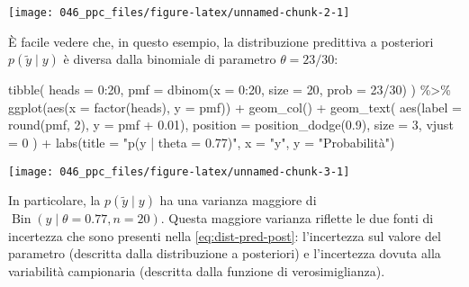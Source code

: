 \documentclass[
]{memoir}
\newenvironment{Shaded}{\begin{snugshade}}{\end{snugshade}}
\newcommand{\AttributeTok}[1]{\textcolor[rgb]{0.77,0.63,0.00}{#1}}
\newcommand{\DecValTok}[1]{\textcolor[rgb]{0.00,0.00,0.81}{#1}}
\newcommand{\FloatTok}[1]{\textcolor[rgb]{0.00,0.00,0.81}{#1}}
\newcommand{\FunctionTok}[1]{\textcolor[rgb]{0.00,0.00,0.00}{#1}}
\newcommand{\NormalTok}[1]{#1}
\newcommand{\SpecialCharTok}[1]{\textcolor[rgb]{0.00,0.00,0.00}{#1}}
\newcommand{\StringTok}[1]{\textcolor[rgb]{0.31,0.60,0.02}{#1}}
\DeclareMathOperator{\Bin}{Bin} %
\theoremstyle{definition}
\theoremstyle{definition}
\theoremstyle{definition}
\theoremstyle{definition}
\theoremstyle{remark}
\begin{document}
\begin{center}\texttt{[image: 046\_ppc\_files/figure-latex/unnamed-chunk-2-1]} \end{center}

È facile vedere che, in questo esempio, la distribuzione predittiva a posteriori \(p(\tilde{y} \mid y)\) è diversa dalla binomiale di parametro \(\theta = 23/30\):

\begin{Shaded}
\begin{Highlighting}[]
\FunctionTok{tibble}\NormalTok{(}
  \AttributeTok{heads =} \DecValTok{0}\SpecialCharTok{:}\DecValTok{20}\NormalTok{, }
  \AttributeTok{pmf =} \FunctionTok{dbinom}\NormalTok{(}\AttributeTok{x =} \DecValTok{0}\SpecialCharTok{:}\DecValTok{20}\NormalTok{, }\AttributeTok{size =} \DecValTok{20}\NormalTok{, }\AttributeTok{prob =} \DecValTok{23}\SpecialCharTok{/}\DecValTok{30}\NormalTok{)}
\NormalTok{) }\SpecialCharTok{\%\textgreater{}\%}
\FunctionTok{ggplot}\NormalTok{(}\FunctionTok{aes}\NormalTok{(}\AttributeTok{x =} \FunctionTok{factor}\NormalTok{(heads), }\AttributeTok{y =}\NormalTok{ pmf)) }\SpecialCharTok{+}
  \FunctionTok{geom\_col}\NormalTok{() }\SpecialCharTok{+}
  \FunctionTok{geom\_text}\NormalTok{(}
    \FunctionTok{aes}\NormalTok{(}\AttributeTok{label =} \FunctionTok{round}\NormalTok{(pmf, }\DecValTok{2}\NormalTok{), }\AttributeTok{y =}\NormalTok{ pmf }\SpecialCharTok{+} \FloatTok{0.01}\NormalTok{),}
    \AttributeTok{position =} \FunctionTok{position\_dodge}\NormalTok{(}\FloatTok{0.9}\NormalTok{),}
    \AttributeTok{size =} \DecValTok{3}\NormalTok{,}
    \AttributeTok{vjust =} \DecValTok{0}
\NormalTok{  ) }\SpecialCharTok{+}
  \FunctionTok{labs}\NormalTok{(}\AttributeTok{title =} \StringTok{"p(y | theta = 0.77)"}\NormalTok{,}
       \AttributeTok{x =} \StringTok{"y"}\NormalTok{,}
       \AttributeTok{y =} \StringTok{"Probabilità"}\NormalTok{) }
\end{Highlighting}
\end{Shaded}

\begin{center}\texttt{[image: 046\_ppc\_files/figure-latex/unnamed-chunk-3-1]} \end{center}

In particolare, la \(p(\tilde{y} \mid y)\) ha una varianza maggiore di \(\Bin(y \mid \theta = 0.77, n = 20)\). Questa maggiore varianza riflette le due fonti di incertezza che sono presenti nella \eqref{eq:dist-pred-post}: l'incertezza sul valore del parametro (descritta dalla distribuzione a posteriori) e l'incertezza dovuta alla variabilità campionaria (descritta dalla funzione di verosimiglianza).
\end{document}
